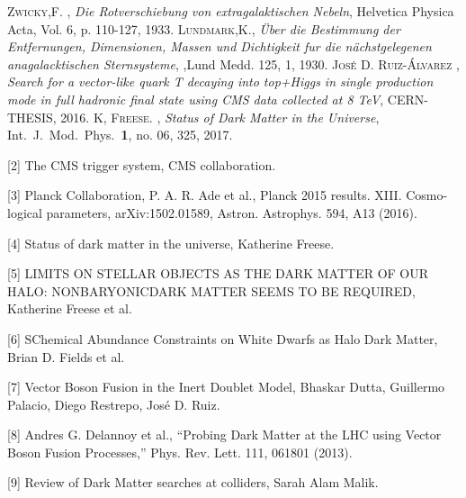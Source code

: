 \newpage



\begin{thebibliography}{X}
 \textsc{Zwicky,F.} ,
\textit{Die Rotverschiebung von extragalaktischen Nebeln}, Helvetica Physica Acta, Vol. 6, p. 110-127, 1933.
 \textsc{Lundmark,K.},
\textit{Über die Bestimmung der Entfernungen, Dimensionen, Massen und Dichtigkeit fur die nächstgelegenen anagalacktischen Sternsysteme},
,Lund Medd. 125, 1, 1930.
 \textsc{José D. Ruiz-Álvarez} ,
\textit{Search for a vector-like quark T decaying into top+Higgs in single production mode in full hadronic final state using CMS data collected at 8 TeV}, CERN-THESIS, 2016.
 \textsc{K, Freese.} ,
\textit{Status of Dark Matter in the Universe},  Int.\ J.\ Mod.\ Phys.\  {\bf 1}, no. 06, 325, 2017.
\end{thebibliography}



[2] The CMS trigger system, CMS collaboration.

\vspace{0.5cm}

[3] Planck Collaboration, P. A. R. Ade et al., Planck 2015 results. XIII. Cosmo-
logical parameters, arXiv:1502.01589, Astron. Astrophys. 594, A13 (2016).

\vspace{0.5cm}

[4] Status of dark matter in the universe, Katherine Freese.

\vspace{0.5cm}

[5] LIMITS ON STELLAR OBJECTS AS THE DARK MATTER OF OUR HALO: NONBARYONICDARK MATTER SEEMS TO BE REQUIRED, Katherine Freese et al.

\vspace{0.5cm}

[6] SChemical Abundance Constraints on White Dwarfs as Halo Dark Matter, Brian D. Fields et al.

\vspace{0.5cm}

[7] Vector Boson Fusion in the Inert Doublet Model, Bhaskar Dutta, Guillermo Palacio, Diego Restrepo, José D. Ruiz.

\vspace{0.5cm}

[8] Andres G. Delannoy et al., “Probing Dark Matter at the LHC using Vector Boson Fusion
Processes,” Phys. Rev. Lett. 111, 061801 (2013).

\vspace{0.5cm}

[9] Review of Dark Matter searches at colliders, Sarah Alam Malik.


